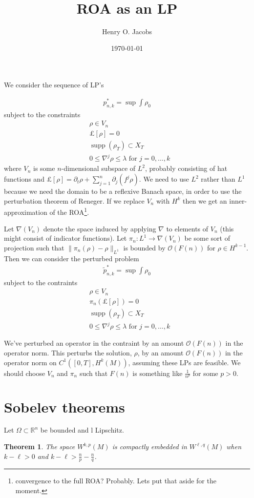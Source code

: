 \documentclass[12pt]{amsart}
\title{ROA as an LP}
\author{Henry O. Jacobs}
\date{\today}
\newtheorem{thm}{Theorem}[section]
\DeclareMathOperator{\supp}{supp}
\begin{document}
\maketitle

We consider the sequence of LP's

\begin{align*}
	p_{n,k}^* = \sup \int \rho_0 
\end{align*}
subject to the constraints
\begin{align*}
	&\rho \in V_n \\
	&\pounds[\rho]= 0 \\
	&\supp( \rho_T) \subset X_T \\
	&0 \leq \nabla^j \rho \leq \lambda \text{ for } j=0,\dots,k
\end{align*}
where $V_n$ is some $n$-dimensional subspace of $L^2$, probably consisting of hat functions
 and $\pounds[\rho] = \partial_t \rho + \sum_{j=1}^{n} \partial_j ( f^j \rho) $.  We need to use $L^2$ rather than $L^1$ because we need the domain to be a reflexive Banach space, in order to use the perturbation theorem of Reneger.
 If we replace $V_n$ with $H^k$ then we get an inner-approximation of the ROA\footnote{convergence to the full ROA?  Probably.  Lets put that aside for the moment.}.
 
Let $\nabla(V_n)$ denote the space induced by applying $\nabla$ to elements of $V_n$ (this might consist of indicator functions).
Let $\pi_n: L^1 \to \nabla(V_n)$ be some sort of projection such that $\| \pi_n(\rho) - \rho \|_{L^1}$ is bounded by $\mathcal{O}(F(n))$ for $\rho \in H^{k-1}$.
Then we can consider the perturbed problem
\begin{align*}
	\tilde{p}_{n,k}^* = \sup \int \rho_0 
\end{align*}
subject to the contraints
\begin{align*}
	&\rho \in V_n \\
	&\pi_n(\pounds[\rho])= 0 \\
	&\supp( \rho_T) \subset X_T \\
	&0 \leq \nabla^j \rho \leq \lambda \text{ for } j=0,\dots,k
\end{align*}

We've perturbed an operator in the contraint by an amount $\mathcal{O}(F(n))$ in the operator norm.
This perturbs the solution, $\rho$, by an amount $\mathcal{O}(F(n))$ in the operator norm on $C^1( [0,T], H^k(M) )$,
assuming these LPs are feasible.
We should choose $V_n$ and $\pi_n$ such that $F(n)$ is something like $\frac{1}{n^p}$ for some $p > 0$.

\appendix
\section{Sobelev theorems}
Let $\Omega \subset \mathbb{R}^n$ be bounded and l Lipschitz.
\begin{thm}
	The space $W^{k,p}(M)$ is compactly embedded in $W^{\ell,q}(M)$ when $k-\ell > 0$ and $k - \ell  > \frac{n}{p} - \frac{n}{q}$.
\end{thm}




\end{document}
